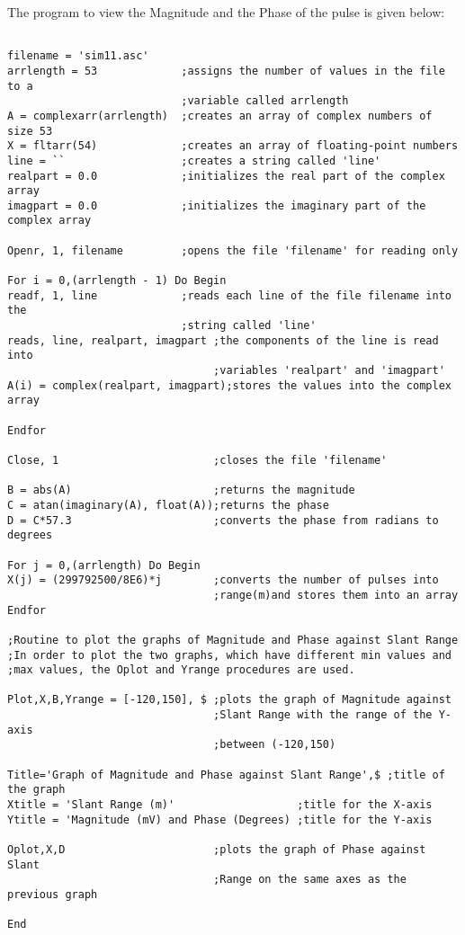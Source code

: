 \documentclass[thmsa,a4paper,ukenglish]{report}
\begin{document}
The program to view the Magnitude and the Phase of the pulse is given below:
\begin{verbatim}
 
filename = 'sim11.asc'
arrlength = 53             ;assigns the number of values in the file to a
                           ;variable called arrlength
A = complexarr(arrlength)  ;creates an array of complex numbers of size 53
X = fltarr(54)             ;creates an array of floating-point numbers
line = ``                  ;creates a string called 'line'
realpart = 0.0             ;initializes the real part of the complex array
imagpart = 0.0             ;initializes the imaginary part of the complex array
 
Openr, 1, filename         ;opens the file 'filename' for reading only
 
For i = 0,(arrlength - 1) Do Begin
readf, 1, line             ;reads each line of the file filename into the
                           ;string called 'line'
reads, line, realpart, imagpart ;the components of the line is read into
                                ;variables 'realpart' and 'imagpart'
A(i) = complex(realpart, imagpart);stores the values into the complex array
 
Endfor
 
Close, 1                        ;closes the file 'filename'
 
B = abs(A)                      ;returns the magnitude
C = atan(imaginary(A), float(A));returns the phase
D = C*57.3                      ;converts the phase from radians to degrees
 
For j = 0,(arrlength) Do Begin
X(j) = (299792500/8E6)*j        ;converts the number of pulses into
                                ;range(m)and stores them into an array
Endfor
 
;Routine to plot the graphs of Magnitude and Phase against Slant Range
;In order to plot the two graphs, which have different min values and
;max values, the Oplot and Yrange procedures are used.
 
Plot,X,B,Yrange = [-120,150], $ ;plots the graph of Magnitude against
                                ;Slant Range with the range of the Y-axis
                                ;between (-120,150)
 
Title='Graph of Magnitude and Phase against Slant Range',$ ;title of the graph
Xtitle = 'Slant Range (m)'                   ;title for the X-axis
Ytitle = 'Magnitude (mV) and Phase (Degrees) ;title for the Y-axis
 
Oplot,X,D                       ;plots the graph of Phase against Slant
                                ;Range on the same axes as the previous graph
 
End
\end{verbatim}
\end{document}
